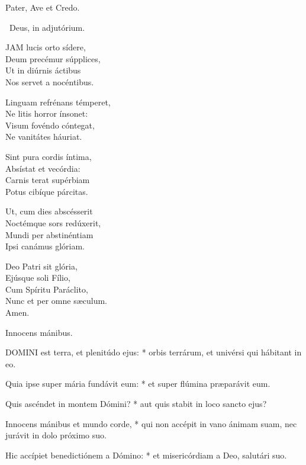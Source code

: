 Pater, Ave et Credo.

\V\ Deus, in adjutórium.


\lettrine[lines=2]{J}{AM} lucis orto sídere,\\
Deum precémur súpplices,\\
Ut in diúrnis áctibus\\
Nos servet a nocéntibus.

Linguam refrénans témperet,\\
Ne litis horror ínsonet:\\
Visum fovéndo cóntegat,\\
Ne vanitátes háuriat.

Sint pura cordis íntima,\\
Absístat et vecórdia:\\
Carnis terat supérbiam\\
Potus cibíque párcitas.

Ut, cum dies abscésserit\\
Noctémque sors redúxerit,\\
Mundi per abstinéntiam\\
Ipsi canámus glóriam.

Deo Patri sit glória,\\
Ejúsque soli Fílio,\\
Cum Spíritu Paráclito,\\
Nunc et per omne sæculum.\\
Amen.

 Innocens mánibus.



\lettrine[lines=2]{D}{OMINI} est terra, et plenitúdo ejus: * orbis terrárum, et univérsi qui hábitant in eo.

Quia ipse super mária fundávit eum: * et super flúmina præparávit eum.

Quis ascéndet in montem Dómini? * aut quis stabit in loco sancto ejus?

Innocens mánibus et mundo corde, * qui non accépit in vano ánimam suam, nec jurávit in dolo próximo suo.

Hic accípiet benedictiónem a Dómino: * et misericórdiam a Deo, salutári suo.

